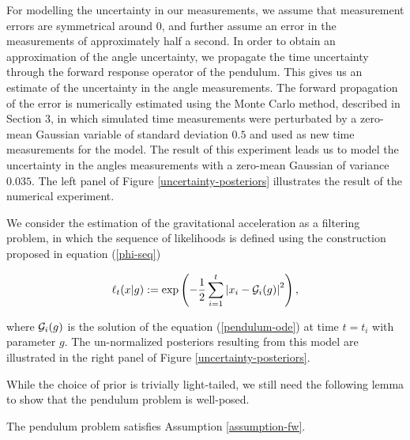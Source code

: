 For modelling the uncertainty in our measurements, we assume that measurement errors are symmetrical around $0$, and further assume an error in the measurements of approximately half a second. In order to obtain an approximation of the angle uncertainty, we propagate the time uncertainty through the forward response operator of the pendulum. This gives us an estimate of the uncertainty in the angle measurements. The forward propagation of the error is numerically estimated using the Monte Carlo method, described in Section 3, in which simulated time measurements were perturbated by a zero-mean Gaussian variable of standard deviation $0.5$ and used as new time measurements for the model. The result of this experiment leads us to model the uncertainty in the angles measurements with a zero-mean Gaussian of variance $0.035$. The left panel of Figure \ref{uncertainty-posteriors} illustrates the result of the numerical experiment.

We consider the estimation of the gravitational acceleration as a filtering problem, in which the sequence of likelihoods is defined using the construction proposed in equation (\ref{phi-seq})

\begin{equation}\label{pendulum-weights}
  \ell_t(x|g) := \exp\left(-\frac12\sum_{i=1}^t\left|x_i - \mathcal{G}_i(g)\right|^2\right),
\end{equation}

where $\mathcal{G}_i(g)$ is the solution of the equation (\ref{pendulum-ode}) at time $t = t_i$ with parameter $g$. The un-normalized posteriors resulting from this model are illustrated in the right panel of Figure \ref{uncertainty-posteriors}.

While the choice of prior is trivially light-tailed, we still need the following lemma to show that the pendulum problem is well-posed.

\begin{lemma} The pendulum problem satisfies Assumption \ref{assumption-fw}.
\end{lemma}


